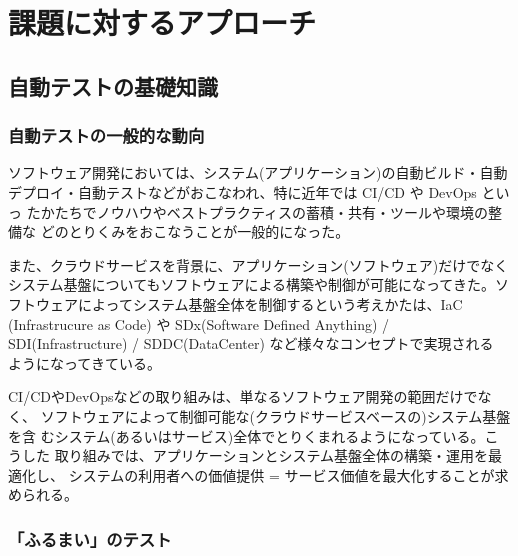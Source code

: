 
\chapter{課題に対するアプローチ}
\label{chap:approach}

\section{自動テストの基礎知識}
\label{sec:latedge-test-automation}


  \subsection{自動テストの一般的な動向}
  \label{sec:popular-test-automation}

ソフトウェア開発においては、システム(アプリケーション)の自動ビルド・自動
デプロイ・自動テストなどがおこなわれ、特に近年では CI/CD や DevOps といっ
たかたちでノウハウやベストプラクティスの蓄積・共有・ツールや環境の整備な
どのとりくみをおこなうことが一般的になった。

また、クラウドサービスを背景に、アプリケーション(ソフトウェア)だけでなく
システム基盤についてもソフトウェアによる構築や制御が可能になってきた。ソ
フトウェアによってシステム基盤全体を制御するという考えかたは、IaC
(Infrastrucure as Code) や SDx(Software Defined Anything) /
SDI(Infrastructure) / SDDC(DataCenter) など様々なコンセプトで実現される
ようになってきている。

CI/CDやDevOpsなどの取り組みは、単なるソフトウェア開発の範囲だけでなく、
ソフトウェアによって制御可能な(クラウドサービスベースの)システム基盤を含
むシステム(あるいはサービス)全体でとりくまれるようになっている。こうした
取り組みでは、アプリケーションとシステム基盤全体の構築・運用を最適化し、
システムの利用者への価値提供 = サービス価値を最大化することが求められる。

  \subsection{「ふるまい」のテスト}
  \label{sec:behavior-test}


